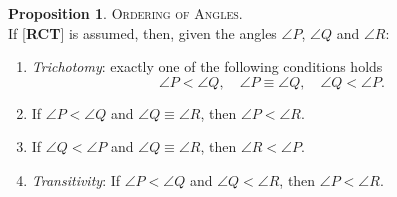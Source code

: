 \documentclass[11pt,a4paper]{article}
\theoremstyle{definition}
\newtheorem{prop}[thm]{Proposition}
\theoremstyle{remark}
\numberwithin{equation}{section}
\begin{document}
\begin{prop}\label{PEN_CP12}\textsc{Ordering of Angles}\textrm{.}\\
If [\textbf{RCT}] is assumed, then, given the angles $\angle P$, $\angle Q$ and $\angle R$:
\begin{enumerate}[label=(\roman*)]
  \item \emph{Trichotomy}: exactly one of the following conditions holds
  \begin{equation*}
    \angle P<\angle Q,\quad \angle P\equiv\angle Q,\quad \angle Q<\angle P.
  \end{equation*}
  \item If $\angle P<\angle Q$ and $\angle Q\equiv\angle R$, then $\angle P <\angle R$.
  \item If $\angle Q<\angle P$ and $\angle Q\equiv\angle R$, then $\angle R<\angle P$.
  \item \emph{Transitivity}: If $\angle P<\angle Q$ and $\angle Q < \angle R$, then $\angle P<\angle R$.
\end{enumerate}
\end{prop}
\end{document}
